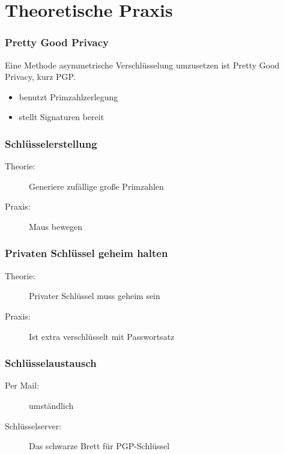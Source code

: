 \documentclass[compress]{beamer}
\begin{document}
\section{Theoretische Praxis}
\label{sec-1-1-4}

\begin{frame}
    \frametitle{Pretty Good Privacy}
    Eine Methode asymmetrische Verschlüsselung umzusetzen ist
    \alert{P}retty \alert{G}ood \alert{P}rivacy, kurz PGP.
    \begin{itemize}
        \item benutzt Primzahlzerlegung
        \item stellt Signaturen bereit
    \end{itemize}
\end{frame}
\begin{frame}
    \frametitle{Schlüsselerstellung}
    \begin{description}
        \item[Theorie:] Generiere zufällige große Primzahlen
        \item[Praxis:] Maus bewegen
    \end{description}
\end{frame}
\begin{frame}
    \frametitle{Privaten Schlüssel geheim halten}
    \begin{description}
        \item[Theorie:] Privater Schlüssel muss geheim sein
        \item[Praxis:] Ist extra verschlüsselt mit \alert{Passwortsatz}
    \end{description}
\end{frame}
\begin{frame}
    \frametitle{Schlüsselaustausch}
    \begin{description}
        \item[Per Mail:] umständlich
        \item[Schlüsselserver:] Das schwarze Brett für PGP-Schlüssel
    \end{description}
\end{frame}
\end{document}
